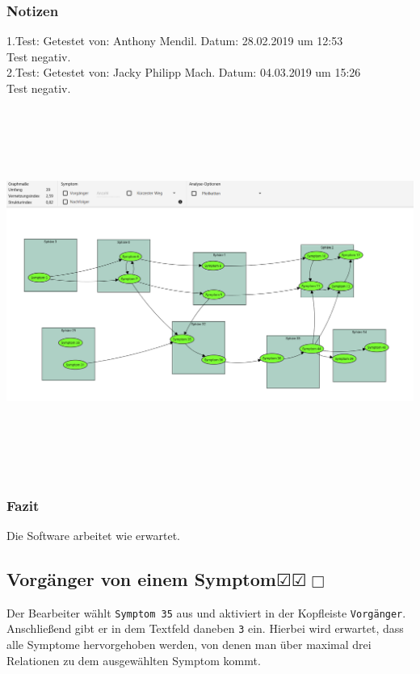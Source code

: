\documentclass[enabledeprecatedfontcommands]{scrartcl}
\newcommand{\subsectiont}[2]{\subsection[#1]{#1{\normalsize\normalfont #2}}}
\newcommand{\leer}{$\Box$}
\newcommand{\ok}{$\CheckedBox$}
\begin{document}
\subsubsection{Notizen}
1.Test: Getestet von: Anthony Mendil. Datum: 28.02.2019 um 12:53 \\
Test negativ. \\
2.Test: Getestet von: Jacky Philipp Mach. Datum: 04.03.2019 um 15:26 \\
Test negativ.
\begin{center}
\includegraphics[height=12cm, angle=90]{analyseStrukturindexetc.PNG}
\end{center}
\subsubsection{Fazit}
Die Software arbeitet wie erwartet.

\subsectiont{Vorgänger von einem Symptom}{\dotfill\ok\ok\leer}
Der Bearbeiter wählt \texttt{Symptom 35} aus und aktiviert in der Kopfleiste \texttt{Vorgänger}. Anschließend gibt er in dem Textfeld daneben \texttt{3} ein. Hierbei wird erwartet, dass alle Symptome hervorgehoben werden, von denen man über maximal drei Relationen zu dem ausgewählten Symptom kommt. 
\end{document}
